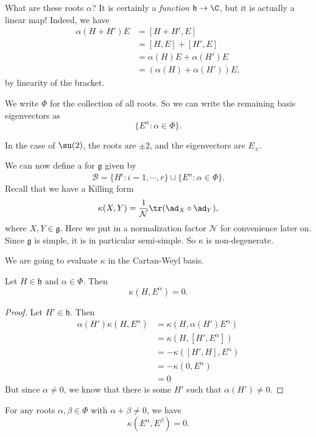 \documentclass[a4paper]{article}
\begin{document}
What are these roots $\alpha$? It is certainly a \emph{function} $\mathfrak{h} \to \C$, but it is actually a linear map! Indeed, we have
\begin{align*}
  \alpha(H + H')E &= [H + H', E] \\
  &= [H, E] + [H', E] \\
  &= \alpha(H) E + \alpha(H') E \\
  &= (\alpha(H) + \alpha(H'))E,
\end{align*}
by linearity of the bracket.

We write $\Phi$\index{$\Phi$} for the collection of all roots. So we can write the remaining basis eigenvectors as
\[
  \{E^\alpha: \alpha \in \Phi\}.
\]
\begin{eg}
  In the case of $\su(2)$, the roots are $\pm 2$, and the eigenvectors are $E_{\pm}$.
\end{eg}

We can now define a  for $\mathfrak{g}$ given by
\[
  \mathcal{B} = \{H^i: i = 1, \cdots, r\} \cup \{E^\alpha: \alpha \in \Phi\}.
\]
Recall that we have a Killing form
\[
 \kappa(X, Y) = \frac{1}{\mathcal{N}} \tr(\ad_X \circ \ad_Y),
\]
where $X, Y \in \mathfrak{g}$. Here we put in a normalization factor $\mathcal{N}$ for convenience later on. Since $\mathfrak{g}$ is simple, it is in particular semi-simple. So $\kappa$ is non-degenerate.

We are going to evaluate $\kappa$ in the Cartan-Weyl basis.

\begin{lemma}
  Let $H \in \mathfrak{h}$ and $\alpha \in \Phi$. Then
  \[
    \kappa(H, E^\alpha) = 0.
  \]
\end{lemma}
\begin{proof}
  Let $H' \in \mathfrak{h}$. Then
  \begin{align*}
    \alpha(H')\kappa(H, E^\alpha) &= \kappa(H, \alpha(H') E^\alpha) \\
    &= \kappa(H, [H', E^\alpha])\\
    &= -\kappa([H', H], E^\alpha)\\
    &= -\kappa(0, E^\alpha)\\
    &= 0
  \end{align*}
  But since $\alpha \not= 0$, we know that there is some $H'$ such that $\alpha(H') \not= 0$.
\end{proof}

\begin{lemma}
  For any roots $\alpha, \beta \in \Phi$ with $\alpha + \beta \not= 0$, we have
  \[
    \kappa(E^\alpha, E^\beta) = 0.
  \]
\end{lemma}
\end{document}
